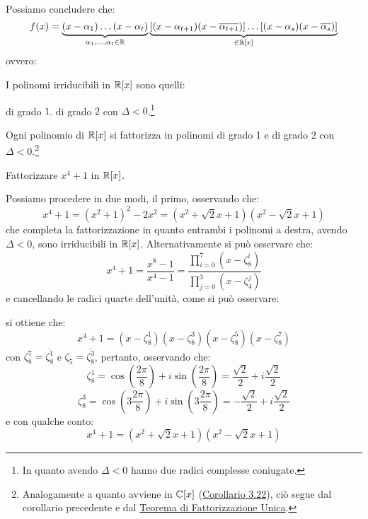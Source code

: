 \documentclass[11pt]{scrartcl}
\begin{document}
Possiamo concludere che:
	\[ f(x) =  \underbrace{(x - \alpha_1) \ldots  (x - \alpha_t)}_{\alpha_1,\ldots,\alpha_t \in \mathbb R} \underbrace{[(x - \alpha_{t+1})(x - \overline{\alpha_{t+1}})] \ldots [(x - \alpha_s)(x - \overline{\alpha_s})]}_{\in \mathbb R[x]}
	\]
ovvero:
\begin{corollary}
I polinomi irriducibili in $\mathbb R[x]$ sono quelli:
	\begin{enumerate}[(1)]
	\ii di grado $1$.
	\ii di grado $2$ con $\Delta < 0$.\footnote{In quanto avendo $\Delta<0$ hanno due radici complesse coniugate.}
	\end{enumerate}
\end{corollary}

\begin{corollary}
Ogni polinomio di $\mathbb R[x]$ si fattorizza in polinomi di grado 1 e di grado 2 con $\Delta < 0$.\footnote{Analogamente a quanto avviene in $\mathbb C[x]$ (\hyperref[p:3.22]{Corollario 3.22}), ciò segue dal corollario precedente e dal \hyperref[p:fac]{Teorema di Fattorizzazione Unica}.}
\end{corollary}

\begin{exercise}
Fattorizzare $x^4+1$ in $\mathbb R[x]$.
\end{exercise}

\begin{soln}
Possiamo procedere in due modi, il primo, osservando che:
	\[ x^4+1 = (x^2+1)^2 - 2x^2 = (x^2 + \sqrt2x + 1)(x^2 - \sqrt2x + 1)
	\]
che completa la fattorizzazione in quanto entrambi i polinomi a destra, avendo $\Delta<0$, sono irriducibili in $\mathbb R[x]$. Alternativamente si può osservare che:
	\[ x^4+1 = \frac{x^8-1}{x^4-1} = \frac{\prod_{i=0}^{7}(x - \zeta_8^i)}{\prod_{j=0}^{3}(x - \zeta_4^j)}
	\]
e cancellando le radici quarte dell'unità, come si può osservare:
\begin{center}
\end{center}
si ottiene che:
	\[  x^4+1 = (x - \zeta_8^1) (x - \zeta_8^3) (x - \zeta_8^5) (x - \zeta_8^7)
	\]
con $\zeta_8^7 = \overline{\zeta_8^1}$ e $\zeta_5 = \overline{\zeta_8^3}$, pertanto, osservando che:
	\[ \zeta_8^1 = \cos{\left(\frac{2\pi}{8}\right)} + i\sin{\left(\frac{2\pi}{8}\right)} = \frac{\sqrt{2}}{2} + i\frac{\sqrt{2}}{2} 
	\]
	\[\zeta_8^3 = \cos{\left(3\frac{2\pi}{8}\right)} + i\sin{\left(3\frac{2\pi}{8}\right)} = -\frac{\sqrt{2}}{2} + i\frac{\sqrt{2}}{2} 
	\]
e con qualche conto:
	\[ x^4+1 = (x^2 + \sqrt2x + 1)(x^2 - \sqrt2x + 1)\]
\end{soln}
\end{document}
